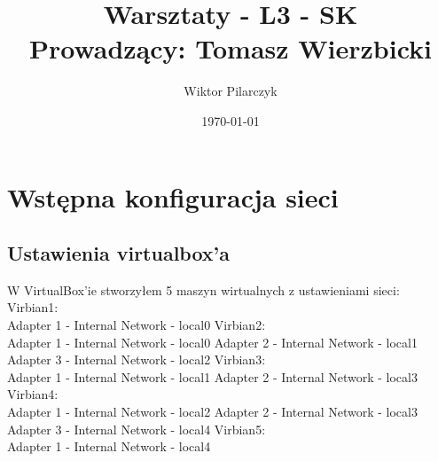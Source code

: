 \documentclass{article}
\author{Wiktor Pilarczyk}
\title{Warsztaty - L3 - SK\\\large{Prowadzący: Tomasz Wierzbicki}}
\date{\today}
\begin{document}
\maketitle
\section{Wstępna konfiguracja sieci}
\subsection{Ustawienia virtualbox'a}
W VirtualBox'ie stworzyłem 5 maszyn wirtualnych z ustawieniami sieci:\\
\tabto{0.4cm}Virbian1:\\
\tabto{0.8cm}    Adapter 1 - Internal Network - local0
\tabto{0.4cm}Virbian2:\\
\tabto{0.8cm}    Adapter 1 - Internal Network - local0
\tabto{0.8cm}    Adapter 2 - Internal Network - local1
\tabto{0.8cm}    Adapter 3 - Internal Network - local2
\tabto{0.4cm}Virbian3:\\
\tabto{0.8cm}    Adapter 1 - Internal Network - local1
\tabto{0.8cm}    Adapter 2 - Internal Network - local3
\tabto{0.4cm}Virbian4:\\
\tabto{0.8cm}    Adapter 1 - Internal Network - local2
\tabto{0.8cm}    Adapter 2 - Internal Network - local3
\tabto{0.8cm}    Adapter 3 - Internal Network - local4
\tabto{0.4cm}Virbian5:\\
\tabto{0.8cm}    Adapter 1 - Internal Network - local4\newpage
\end{document}
